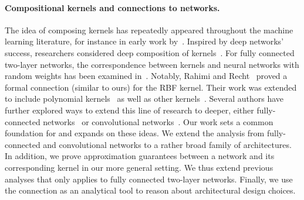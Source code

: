 \paragraph{Compositional kernels and connections to networks.} The idea of
composing kernels has repeatedly appeared throughout the machine learning
literature, for instance in early work by~\citet{scholkopf1998prior,
grauman2005pyramid}. Inspired by deep networks' success, researchers
considered deep composition of kernels~\cite{mairal2014convolutional,
cho2009kernel, bo2011object}. For fully connected two-layer networks, the
correspondence between kernels and neural networks with random weights has
been examined in~\cite{rahimi2009weighted, RahimiRe07, neal2012bayesian,
williams1997infinite}. Notably, Rahimi and Recht~\cite{rahimi2009weighted}
proved a formal connection (similar to ours) for the RBF kernel. Their work
was extended to include polynomial kernels~\cite{kar2012random,
pennington2015spherical} as well as other kernels~\cite{bach2015equivalence,
bach2014breaking}. Several authors have further explored ways to extend this
line of research to deeper, either fully-connected
networks~\cite{cho2009kernel} or convolutional networks~\cite{hazan2015steps,
anselmi2015deep, mairal2014convolutional}.  Our work sets a common foundation
for and expands on these ideas. We extend the analysis from fully-connected
and convolutional networks to a rather broad family of architectures. In
addition, we prove approximation guarantees between a network and its
corresponding kernel in our more general setting. We thus extend previous
analyses that only applies to fully connected two-layer networks. Finally, we
use the connection as an analytical tool to reason about architectural design
choices.
